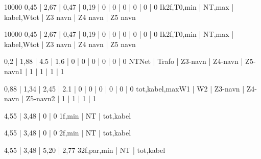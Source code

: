 \documentclass[a4paper,oneside,10pt,danish]{report}
\begin{document}
\begin{HV-ZtilIk2f}{10000}{ 0,45 | 2,67 | 0,47 | 0,19 | 0 | 0 | 0 | 0 | 0 | 0 }{Ik2f,T0,min | NT,max | kabel,Wtot | Z3 navn | Z4 navn | Z5 navn}
\end{HV-ZtilIk2f}

\begin{HV-ZtilIk3f}{10000}{ 0,45 | 2,67 | 0,47 | 0,19 | 0 | 0 | 0 | 0 | 0 | 0 }{Ik2f,T0,min | NT,max | kabel,Wtot | Z3 navn | Z4 navn | Z5 navn}
\end{HV-ZtilIk3f}

\begin{Ztotal}{ 0,2 | 1,88 | 4.5 | 1,6 | 0 | 0 | 0 | 0 | 0 | 0 }{NT}{Net | Trafo | Z3-navn | Z4-navn | Z5-navn}{1 | 1 | 1 | 1 | 1}
\end{Ztotal}

\begin{LV-Ztotal-max}{ 0,88 | 1,34 | 2,45 | 2.1 | 0 | 0 | 0 | 0 | 0 | 0 }{tot,kabel,max}{W1 | W2 | Z3-navn | Z4-navn | Z5-navn}{2 | 1 | 1 | 1 | 1}
\end{LV-Ztotal-max}

\begin{LV-Ik1f-kA}{ 4,55 | 3,48 | 0 | 0 }{1f,min | NT | tot,kabel}
\end{LV-Ik1f-kA}

\begin{LV-Ik2f-kA}{ 4,55 | 3,48 | 0 | 0 }{2f,min | NT | tot,kabel}
\end{LV-Ik2f-kA}

\begin{LV-Ik2f,parSikr-kA}{ 4,55 | 3,48 | 5,20 | 2,77 }{3}{2f,par,min | NT | tot,kabel}
\end{LV-Ik2f,parSikr-kA}
\end{document}
